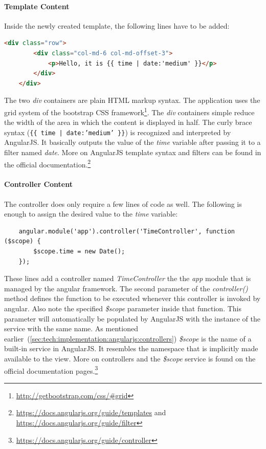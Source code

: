 \documentclass[nochapterpage,nopartpage,noheadingspace,numbersubsubsec,bigchapter,colorback,accentcolor=tud9c,10pt]{tudreport}
\begin{document}
  \paragraph{Template Content}
    Inside the newly created template, the following lines have to be added:
        \begin{lstlisting}[language=html]
    <div class="row">
        <div class="col-md-6 col-md-offset-3">
            <p>Hello, it is {{ time | date:'medium' }}</p>
        </div>
    </div>
        \end{lstlisting}
    The two \emph{div} containers are plain HTML markup syntax. The application uses the grid system of the bootstrap CSS framework\footnote{\url{http://getbootstrap.com/css/\#grid}}. The \emph{div} containers simple reduce the width of the area in which the content is displayed in half. The curly brace syntax (\texttt{\{\{ time | date:'medium' \}\}}) is recognized and interpreted by AngularJS. It basically outputs the value of the \emph{time} variable after passing it to a filter named \emph{date}. More on AngularJS template syntax and filters can be found in the official documentation.\footnote{\url{https://docs.angularjs.org/guide/templates} and \url{https://docs.angularjs.org/guide/filter}}

  \paragraph{Controller Content}
    The controller does only require a few lines of code as well. The following is enough to assign the desired value to the \emph{time} variable:
        \begin{lstlisting}
    angular.module('app').controller('TimeController', function ($scope) {
        $scope.time = new Date();
    });
        \end{lstlisting}
    These lines add a controller named \emph{TimeController} the the \emph{app} module that is managed by the angular framework. The second parameter of the \emph{controller()} method defines the function to be executed whenever this controller is invoked by angular. Also note the specified \emph{\$scope} parameter inside that function. This parameter will automatically be populated by AngularJS with the instance of the service with the same name. As mentioned earlier~(\ref{sec:tech:implementation:angularjs:controllers}) \emph{\$scope} is the name of a built-in service in AngularJS. It resembles the namespace that is implicitly made available to the view. More on controllers and the \emph{\$scope} service is found on the official documentation pages.\footnote{\url{https://docs.angularjs.org/guide/controller}}
\end{document}
